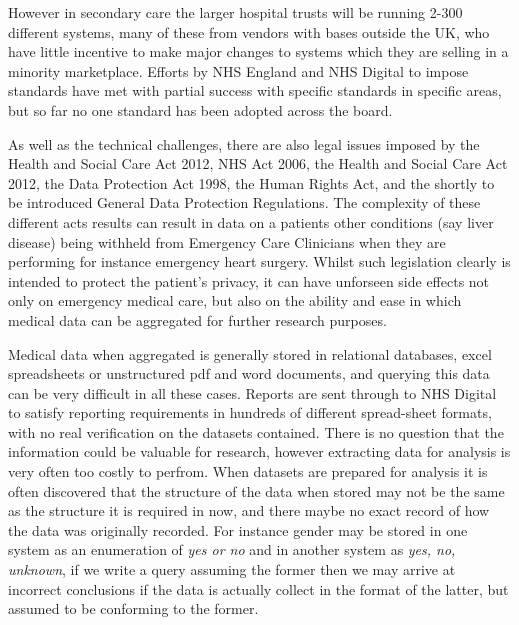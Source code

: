 \documentclass[a4paper,twoside]{article}
\begin{document}
However in secondary care the larger hospital trusts will be running 2-300 different systems, many of these from vendors with bases outside the UK, who have little incentive to make major changes to systems which they are selling in a minority marketplace. Efforts by NHS England and NHS Digital to impose standards have met with partial success with specific standards in specific areas, but so far no one standard has been adopted across the board. 

As well as the technical challenges, there are also legal issues imposed by the Health and Social Care Act 2012, NHS Act 2006, the Health and Social Care Act 2012, the Data Protection Act 1998, the Human Rights Act, and the shortly to be introduced General Data Protection Regulations.  The complexity of these different acts results can result in data on a patients other conditions (say liver disease) being withheld from Emergency Care Clinicians when they are performing for instance emergency heart surgery. Whilst such legislation clearly is intended to protect the patient's privacy, it can have unforseen side effects not only on emergency medical care, but also on the ability and ease in which medical data can be aggregated for further research purposes.

Medical data when aggregated is generally stored in relational databases, excel spreadsheets or unstructured pdf and word documents, and querying this data can be very difficult in all these cases. Reports are sent through to NHS Digital to satisfy reporting requirements in hundreds of different spread-sheet formats, with no real verification on the datasets contained. There is no question that the information could be valuable for research, however extracting data for analysis is very often too costly to perfrom.  When datasets are prepared for analysis it is often discovered that the structure of the data when stored may not be the same as the structure it is required in now, and there maybe no exact record of how the data was originally recorded. For instance gender may be stored in one system as an enumeration of \emph{yes or no} and in another system as \emph{yes, no, unknown}, if we write a query assuming the former then we may arrive at incorrect conclusions if the data is actually collect in the format of the latter, but assumed to be conforming to the former. 
\end{document}
